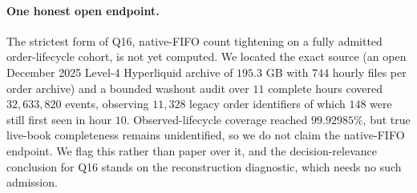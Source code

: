 \paragraph{One honest open endpoint.} The strictest form of Q16, native-FIFO count
tightening on a fully admitted order-lifecycle cohort, is not yet computed. We located
the exact source (an open December 2025 Level-4 Hyperliquid archive of $195.3$ GB with
$744$ hourly files per order archive) and a bounded washout audit over $11$ complete hours
covered $32{,}633{,}820$ events, observing $11{,}328$ legacy order identifiers of which
$148$ were still first seen in hour $10$. Observed-lifecycle coverage reached
$99.92985\%$, but true live-book completeness remains unidentified, so we do not claim the
native-FIFO endpoint. We flag this rather than paper over it, and the decision-relevance
conclusion for Q16 stands on the reconstruction diagnostic, which needs no such admission.
